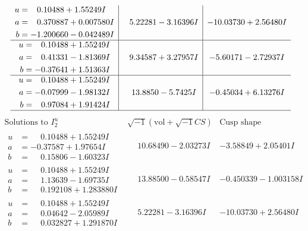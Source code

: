 \documentclass[1p]{elsarticle_modified}
\theoremstyle{definition}
\newcommand{\I}{\sqrt{-1}}
\begin{document}
$$\begin{array}{c|c|c}
\begin{aligned}
u &= \phantom{-}0.10488 + 1.55249 I \\
a &= \phantom{-}0.370887 + 0.007580 I \\
b &= -1.200660 - 0.042489 I\end{aligned}
 & \phantom{-}5.22281 - 3.16396 I & -10.03730 + 2.56480 I \\ \hline\begin{aligned}
u &= \phantom{-}0.10488 + 1.55249 I \\
a &= \phantom{-}0.41331 - 1.81369 I \\
b &= -0.37641 + 1.51363 I\end{aligned}
 & \phantom{-}9.34587 + 3.27957 I & -5.60171 - 2.72937 I \\ \hline\begin{aligned}
u &= \phantom{-}0.10488 + 1.55249 I \\
a &= -0.07999 - 1.98132 I \\
b &= \phantom{-}0.97084 + 1.91424 I\end{aligned}
 & \phantom{-}13.8850 - 5.7425 I & -0.45034 + 6.13276 I\\
 \hline 
 \end{array}$$\newpage$$\begin{array}{c|c|c}  
\text{Solutions to }I^u_{2}& \I (\text{vol} + \sqrt{-1}CS) & \text{Cusp shape}\\
 \hline 
\begin{aligned}
u &= \phantom{-}0.10488 + 1.55249 I \\
a &= -0.37587 + 1.97654 I \\
b &= \phantom{-}0.15806 - 1.60323 I\end{aligned}
 & \phantom{-}10.68490 - 2.03273 I & -3.58849 + 2.05401 I \\ \hline\begin{aligned}
u &= \phantom{-}0.10488 + 1.55249 I \\
a &= \phantom{-}1.13639 - 1.69735 I \\
b &= \phantom{-}0.192108 + 1.283880 I\end{aligned}
 & \phantom{-}13.88500 - 0.58547 I & -0.450339 - 1.003158 I \\ \hline\begin{aligned}
u &= \phantom{-}0.10488 + 1.55249 I \\
a &= \phantom{-}0.04642 - 2.05989 I \\
b &= \phantom{-}0.032827 + 1.291870 I\end{aligned}
 & \phantom{-}5.22281 - 3.16396 I & -10.03730 + 2.56480 I \\ \hline\begin{aligned}

\end{aligned}
\end{array}$$
\end{document}
